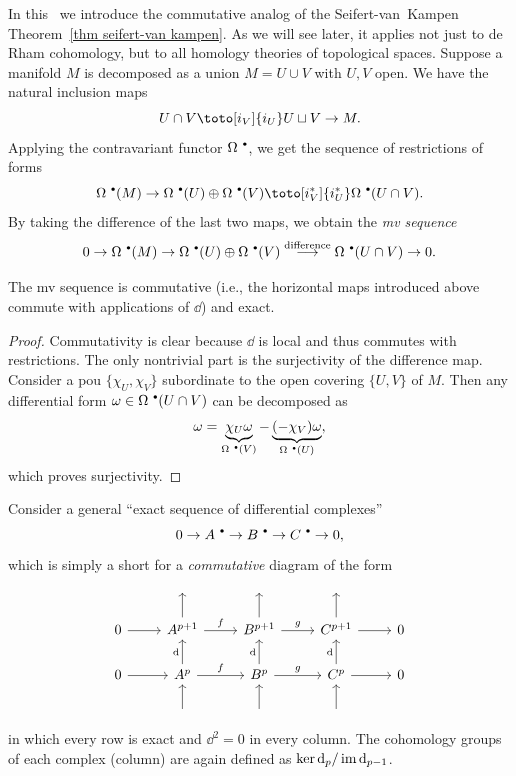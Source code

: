 In this \sect\ we introduce the commutative analog of the Seifert-van~Kampen Theorem~\ref{thm seifert-van kampen}. As we will see later, it applies not just to de Rham cohomology, but to all homology theories of topological spaces. Suppose a manifold $M$ is decomposed as a union $M=U\cup V$ with $U,V$ open. We have the natural inclusion maps
\[U\cap V\toto[i_V]{i_U}U\sqcup V\to M. \]
Applying the contravariant functor $\Omega^{\smbullet }$, we get the sequence of restrictions of forms
\[\Omega^{\smbullet }(M)\to \Omega^{\smbullet }(U)\oplus\Omega^{\smbullet }(V)\toto[i_V^\ast]{i_U^\ast}\Omega^{\smbullet }(U\cap V).\]
By taking the difference of the last two maps, we obtain the \emph{\gls{mv} sequence}
\[0\to\Omega^{\smbullet } (M)\to\Omega^{\smbullet }(U)\oplus\Omega^{\smbullet }(V)\overset{\text{difference}}\longrightarrow\Omega^{\smbullet } (U\cap V)\to 0.\]

\begin{prop}
    The \gls{mv} sequence is commutative (i.e., the horizontal maps introduced above commute with applications of $\dd$) and exact.
\end{prop}
\begin{proof}
    Commutativity is clear because $\dd$ is local and thus commutes with restrictions. The only nontrivial part is the surjectivity of the difference map. Consider a \gls{pou} $\{\chi_U,\chi_V\}$ subordinate to the open covering $\{U,V\}$ of $M$. Then any differential form $\omega\in\Omega^{\smbullet }(U\cap V)$ can be decomposed as 
    \[\omega=\underbrace{\chi_U\omega}_{\Omega^{\smbullet }(V)}-\underbrace{(-\chi_V)\omega}_{\Omega^{\smbullet }(U)},\]
    which proves surjectivity.
\end{proof}

Consider a general ``exact sequence of differential complexes'' 
\[0\to A^{\smbullet }\to B^{\smbullet }\to C^{\smbullet } \to 0,\]
which is simply a short for a \emph{commutative} diagram of the form
\[\begin{tikzcd}
        \; & \; & \; &\; &\; \\
        0 \arrow[r]& A^{p+1}\arrow[r,"f"]\arrow[u] &B^{p+1}\arrow[u]\arrow[r,"g"]& C^{p+1}\arrow[r]\arrow[u]& 0\\
       0\arrow[r] & A^p\arrow[r,"f"]\arrow[u,"\dd"] &B^p\arrow[u,"\dd"]\arrow[r,"g"]&C^p\arrow[u,"\dd"]\arrow[r]&0 \\
        &\arrow[u] & \arrow[u]& \arrow[u] &
\end{tikzcd}\]
in which every row is exact and $\dd^2=0$ in every column. The cohomology groups of each complex (column) are again defined as $\ker \mathop{}\!\mathrm{d}_{p}/\operatorname{im} \mathop{}\!\mathrm{d}_{p-1}$. 

